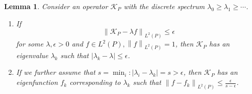 \documentclass{article}
\newcommand{\norm}[1]{\left\lVert#1\right\rVert}
\newcommand{\abs}[1]{\left \lvert #1 \right \rvert}
\newcommand{\1}{\mathbb{I}}
\theoremstyle{alden}
\theoremstyle{aldenthm}
\newtheorem{lemma}{Lemma}
\theoremstyle{definition}
\theoremstyle{remark}
\begin{document}
\begin{lemma}
	Consider an operator $\mathcal{K}_P$ with the discrete spectrum $\lambda_0 \geq \lambda_1 \geq \cdots$. 
	\begin{enumerate}
		\item If 
		\begin{equation*}
		\norm{\mathcal{K}_P - \lambda f}_{L^2(P)} \leq \epsilon
		\end{equation*}
		for some $\lambda,\epsilon> 0$ and $f \in L^2(P), \norm{f}_{L^2(P)} = 1$, then $\mathcal{K}_P$ has an eigenvalue $\lambda_k$ such that $\abs{\lambda_k - \lambda} \leq \epsilon$. 
		\item If we further assume that $s = \min_i: \abs{\lambda_i - \lambda_k} = s > \epsilon$, then $\mathcal{K}_P$ has an eigenfunction $f_k$ corresponding to $\lambda_k$ such that $\norm{f - f_k}_{L^2(P)} \leq \frac{\epsilon}{s - \epsilon}$. 
	\end{enumerate}
\end{lemma}
\end{document}
